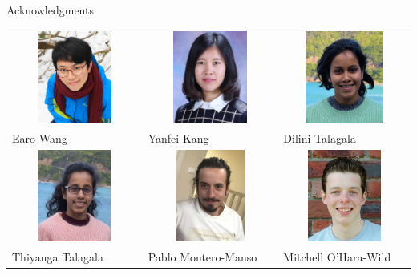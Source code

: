 \documentclass[14pt,ignorenonframetext,]{beamer}
\begin{document}
\begin{frame}{Acknowledgments}
\protect\hypertarget{acknowledgments}{}

\begin{block}{}

\fontsize{11}{11}\sf

\centering

\begin{tabular}{p{3.2cm}p{3.4cm}p{3.4cm}}
\includegraphics[height=3cm, width=10cm, keepaspectratio]{earowang} &
\includegraphics[height=3cm, width=10cm, keepaspectratio]{yanfei} &
\includegraphics[height=3cm, width=10cm, keepaspectratio]{dilini}\\
Earo Wang  & Yanfei Kang & Dilini Talagala \\
\includegraphics[height=3cm, width=10cm, keepaspectratio]{thiyanga} &
\includegraphics[height=3cm, width=10cm, keepaspectratio]{pablo} &
\includegraphics[height=3cm, width=10cm, keepaspectratio]{mitch}\\
Thiyanga Talagala & Pablo Montero-Manso\hspace*{-1cm} & Mitchell O'Hara-Wild
\end{tabular}

\end{block}

\end{frame}
\end{document}
